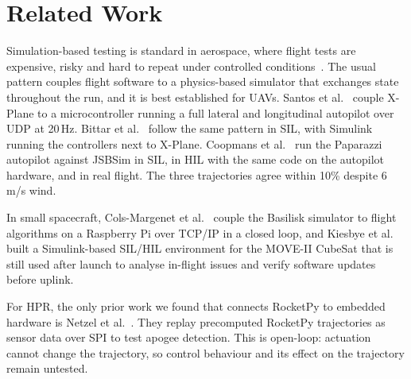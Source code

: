 \section{Related Work}\label{s:related}
Simulation-based testing is standard in aerospace, where flight tests are expensive, risky and hard to repeat under controlled conditions~\cite{bittar-guidance-sil-uav-xplane-simulink, santos-hil-uav-autopilot}. The usual pattern couples flight software to a physics-based simulator that exchanges state throughout the run, and it is best established for UAVs. Santos et al.~\cite{santos-hil-uav-autopilot} couple X-Plane to a microcontroller running a full lateral and longitudinal autopilot over UDP at 20\,Hz. Bittar et al.~\cite{bittar-guidance-sil-uav-xplane-simulink} follow the same pattern in SIL, with Simulink running the controllers next to X-Plane. Coopmans et al.~\cite{coopmans-sil-hil-verification-uav} run the Paparazzi autopilot against JSBSim in SIL, in HIL with the same code on the autopilot hardware, and in real flight. The three trajectories agree within 10\% despite 6\,m/s wind.

In small spacecraft, Cols-Margenet et al.~\cite{colsmargenet2017modular} couple the Basilisk simulator to flight algorithms on a Raspberry Pi over TCP/IP in a closed loop, and Kiesbye et al.~\cite{kiesbye2019-moveII-cubsat} built a Simulink-based SIL/HIL environment for the MOVE-II CubeSat that is still used after launch to analyse in-flight issues and verify software updates before uplink.

For HPR, the only prior work we found that connects RocketPy to embedded hardware is Netzel et al.~\cite{netzel-rocketpy-hil}. They replay precomputed RocketPy trajectories as sensor data over SPI to test apogee detection. This is open-loop: actuation cannot change the trajectory, so control behaviour and its effect on the trajectory remain untested.

